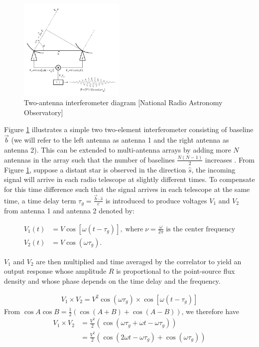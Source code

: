 \begin{figure}[h!]
  \centering
    \includegraphics[width=0.45\textwidth]{images/Rint.png}
    \caption{Two-antenna interferometer diagram [National Radio Astronomy Observatory]}
  \label{images/Rint.png}
\end{figure}

Figure \ref{images/Rint.png} illustrates a simple two two-element interferometer consisting of baseline $\overrightarrow{b}$ (we will refer to the left antenna as antenna 1 and the right antenna as antenna 2). This can be extended to multi-antenna arrays by adding more $N$ antennas in the array such that the number of baselines  $\frac{N(N-1)}{2}$  increases \citep{zensus1995very}. From Figure \ref{images/Rint.png}, suppose a distant star is observed in the direction $\widehat{s}$, the incoming signal will arrive in each radio telescope at slightly  different times. To compensate for this time difference such that the signal arrives in each telescope at the same time, a time delay term $\tau_{g}=\frac{\overrightarrow{b}\cdot\widehat{s}}{c}$ is introduced to produce voltages $V_1$ and $V_2$ from antenna 1 and antenna 2 denoted by: 

\begin{equation}\label{eq111}
\begin{split}
V_1(t)&=V\cos[\omega(t-\tau_{g})],\; \text{where} \;\nu=\frac{\omega}{2\pi}\; \text{is the center frequency} \\
V_2(t)&=V\cos(\omega\tau_{g}).
\end{split}
\end{equation}

$V_1$ and $V_2$ are then  multiplied and time averaged by the correlator to yield an output response whose amplitude $R$ is proportional to the point-source flux density and whose phase depends on the time delay and the frequency.

\begin{align}
V_1 \times V_2 = V^2 \cos(\omega\tau_{g})\times \cos[\omega(t-\tau_{g})]
\end{align}
From $\cos A\cos B= \frac{1}{2} \left(\cos (A+B) + \cos (A-B) \right)$, 
we therefore have 
\begin{align*}
V_1 \times V_2&= \frac{V^2}{2} \left( \cos(\omega\tau_{g} + \omega t-\omega \tau_{g} )\right)\\
&= \frac{V^2}{2} \left(\cos(2\omega t - \omega \tau_{g}) + \cos (\omega\tau_{g})\right)
\end{align*}

